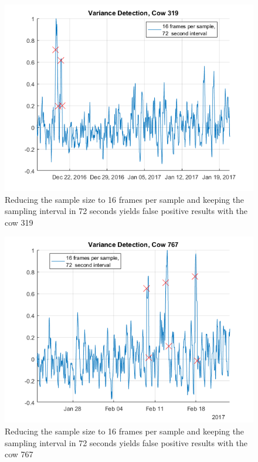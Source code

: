\begin{figure}[htb]
\centering
\includegraphics[width = 0.75 \textwidth]{figures/VarianceDetectionCow319_16frames72seconds.png}
\caption{Reducing the sample size to 16 frames per sample and keeping the sampling interval in 72 seconds yields false positive results with the cow 319}
\label{VarianceDetectionCow319_16frames72seconds}
\end{figure}

\begin{figure}[htb]
\centering
\includegraphics[width = 0.75 \textwidth]{figures/VarianceDetectionCow767_16frames72seconds.png}
\caption{Reducing the sample size to 16 frames per sample and keeping the sampling interval in 72 seconds yields false positive results with the cow 767}
\label{VarianceDetectionCow767_16frames72seconds}
\end{figure}


